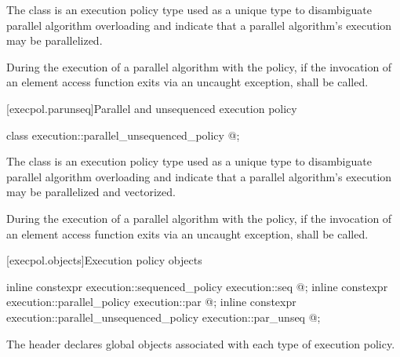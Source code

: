\begin{itemdescr}
\pnum
The class  is an execution policy type used as
a unique type to disambiguate parallel algorithm overloading and indicate that
a parallel algorithm's execution may be parallelized.

\pnum
During the execution of a parallel algorithm with
the  policy,
if the invocation of an element access function exits via an uncaught exception,
 shall be called.
\end{itemdescr}

[execpol.parunseq]{Parallel and unsequenced execution policy}

%
\begin{itemdecl}
class execution::parallel_unsequenced_policy { @\unspec@ };
\end{itemdecl}

\begin{itemdescr}
\pnum
The class  is an execution policy type
used as a unique type to disambiguate parallel algorithm overloading and
indicate that a parallel algorithm's execution may be parallelized and
vectorized.

\pnum
During the execution of a parallel algorithm with
the  policy,
if the invocation of an element access function exits via an uncaught exception,
 shall be called.
\end{itemdescr}

[execpol.objects]{Execution policy objects}

%
%
%
%
%
%
\begin{itemdecl}
inline constexpr execution::sequenced_policy            execution::seq{ @\unspec@ };
inline constexpr execution::parallel_policy             execution::par{ @\unspec@ };
inline constexpr execution::parallel_unsequenced_policy execution::par_unseq{ @\unspec@ };
\end{itemdecl}

\begin{itemdescr}
\pnum
The header  declares global objects associated with each type of execution policy.
\end{itemdescr}

